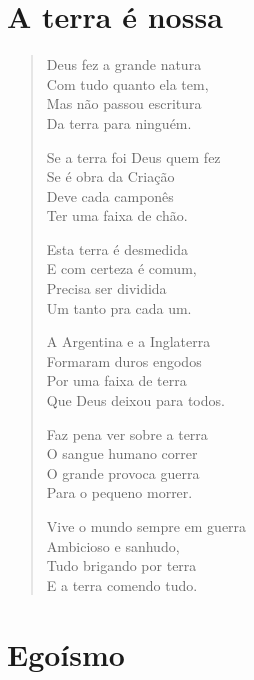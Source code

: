 \chapter{A terra é nossa}

\begin{verse}
Deus fez a grande natura\\
Com tudo quanto ela tem,\\
Mas não passou escritura\\
Da terra para ninguém.

Se a terra foi Deus quem fez\\
Se é obra da Criação\\
Deve cada camponês\\
Ter uma faixa de chão.

Esta terra é desmedida\\
E com certeza é comum,\\
Precisa ser dividida\\
Um tanto pra cada um.

A Argentina e a Inglaterra\\
Formaram duros engodos\\
Por uma faixa de terra\\
Que Deus deixou para todos.

Faz pena ver sobre a terra\\
O sangue humano correr\\
O grande provoca guerra\\
Para o pequeno morrer.

Vive o mundo sempre em guerra\\
Ambicioso e sanhudo,\\
Tudo brigando por terra\\
E a terra comendo tudo.
\end{verse}

\chapter{Egoísmo}

